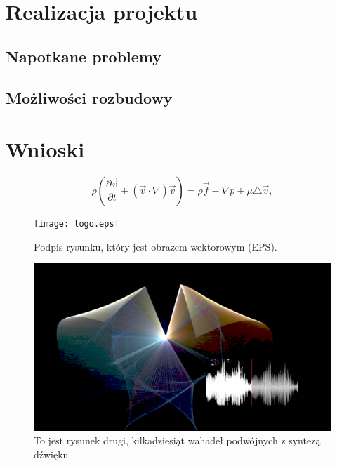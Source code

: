 \documentclass[a4paper,12pt,reqno]{article}
\begin{document}
\newpage
\section{Realizacja projektu}
\subsection{Napotkane problemy}
\subsection{Możliwości rozbudowy}

\newpage
\section{Wnioski}

\newpage





\newpage

\begin{equation} 
\rho\left(\frac{\partial\vec v}{\partial t}+(\vec v\cdot\nabla)\vec v\right) =\rho\vec f - \nabla p + \mu\triangle\vec v, \label{rownanie}
\end{equation} 

\begin{figure}[!ht]%
\centering
\texttt{[image: logo.eps]}
\caption{Podpis rysunku, który jest obrazem wektorowym (EPS). \label{logotyp}}
\qquad
\end{figure}   

\begin{figure}[!ht]%
\centering
\includegraphics[width=0.8\columnwidth]{pendulums.png}
\caption{To jest rysunek drugi, kilkadziesiąt wahadeł podwójnych z syntezą dźwięku.\label{wahadla}}%
%
\qquad
\end{figure} 
\end{document}
